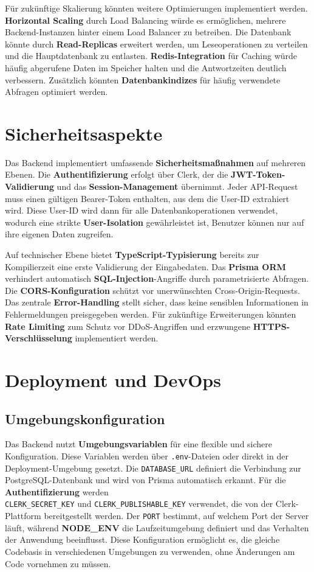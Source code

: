 Für zukünftige Skalierung könnten weitere Optimierungen implementiert werden. \textbf{Horizontal Scaling} durch Load Balancing würde es ermöglichen, mehrere Backend-Instanzen hinter einem Load Balancer zu betreiben. Die Datenbank könnte durch \textbf{Read-Replicas} erweitert werden, um Leseoperationen zu verteilen und die Hauptdatenbank zu entlasten. \textbf{Redis-Integration} für Caching würde häufig abgerufene Daten im Speicher halten und die Antwortzeiten deutlich verbessern. Zusätzlich könnten \textbf{Datenbankindizes} für häufig verwendete Abfragen optimiert werden.

\section{Sicherheitsaspekte}

Das Backend implementiert umfassende \textbf{Sicherheitsmaßnahmen} auf mehreren Ebenen. Die \textbf{Authentifizierung} erfolgt über Clerk, der die \textbf{JWT-Token-Validierung} und das \textbf{Session-Management} übernimmt. Jeder API-Request muss einen gültigen Bearer-Token enthalten, aus dem die User-ID extrahiert wird. Diese User-ID wird dann für alle Datenbankoperationen verwendet, wodurch eine strikte \textbf{User-Isolation} gewährleistet ist, Benutzer können nur auf ihre eigenen Daten zugreifen.

Auf technischer Ebene bietet \textbf{TypeScript-Typisierung} bereits zur Kompilierzeit eine erste Validierung der Eingabedaten. Das \textbf{Prisma ORM} verhindert automatisch \textbf{SQL-Injection}-Angriffe durch parametrisierte Abfragen. Die \textbf{CORS-Konfiguration} schützt vor unerwünschten Cross-Origin-Requests. Das zentrale \textbf{Error-Handling} stellt sicher, dass keine sensiblen Informationen in Fehlermeldungen preisgegeben werden. Für zukünftige Erweiterungen könnten \textbf{Rate Limiting} zum Schutz vor DDoS-Angriffen und erzwungene \textbf{HTTPS-Verschlüsselung} implementiert werden.

\section{Deployment und DevOps}

\subsection{Umgebungskonfiguration}

Das Backend nutzt \textbf{Umgebungsvariablen} für eine flexible und sichere Konfiguration. Diese Variablen werden über \texttt{.env}-Dateien oder direkt in der Deployment-Umgebung gesetzt. Die \texttt{DATABASE\_URL} definiert die Verbindung zur PostgreSQL-Datenbank und wird von Prisma automatisch erkannt. Für die \textbf{Authentifizierung} werden\\ \texttt{CLERK\_SECRET\_KEY} und \texttt{CLERK\_PUBLISHABLE\_KEY} verwendet, die von der Clerk-Plattform bereitgestellt werden. Der \texttt{PORT} bestimmt, auf welchem Port der Server läuft, während \textbf{NODE\_ENV} die Laufzeitumgebung definiert und das Verhalten der Anwendung beeinflusst. Diese Konfiguration ermöglicht es, die gleiche Codebasis in verschiedenen Umgebungen zu verwenden, ohne Änderungen am Code vornehmen zu müssen.

